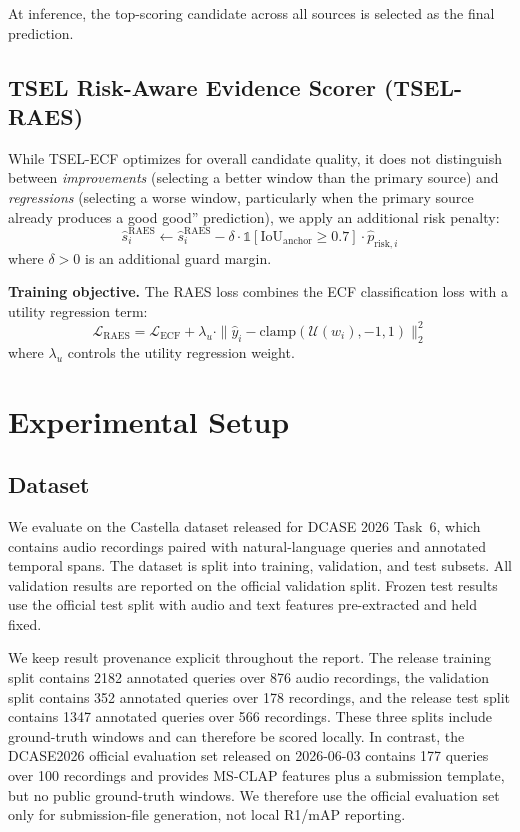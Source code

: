 \documentclass[conference]{IEEEtran}
\begin{document}
At inference, the top-scoring candidate across all sources is selected as the
final prediction.

\subsection{TSEL Risk-Aware Evidence Scorer (TSEL-RAES)}
\label{sec:raes}

While TSEL-ECF optimizes for overall candidate quality, it does not
distinguish between \emph{improvements} (selecting a better window than the
primary source) and \emph{regressions} (selecting a worse window, particularly
when the primary source already produces a good good'' prediction), we apply an additional risk
penalty:
\begin{equation}
\label{eq:anchor_guard}
\hat{s}_i^{\text{RAES}} \leftarrow \hat{s}_i^{\text{RAES}} - \delta \cdot
\mathbb{1}[\text{IoU}_{\text{anchor}} \geq 0.7] \cdot \hat{p}_{\text{risk}, i}
\end{equation}
where \(\delta > 0\) is an additional guard margin.

\textbf{Training objective.}  The RAES loss combines the ECF classification loss
with a utility regression term:
\begin{equation}
\label{eq:raes_loss}
\mathcal{L}_{\text{RAES}} = \mathcal{L}_{\text{ECF}} + \lambda_u \cdot
\| \hat{y}_i - \text{clamp}(\mathcal{U}(w_i), -1, 1) \|_2^2
\end{equation}
where \(\lambda_u\) controls the utility regression weight.

\section{Experimental Setup}
\label{sec:setup}

\subsection{Dataset}
We evaluate on the Castella dataset released for DCASE 2026 Task~6, which
contains audio recordings paired with natural-language queries and annotated
temporal spans.  The dataset is split into training, validation, and test
subsets.  All validation results are reported on the official validation split.
Frozen test results use the official test split with audio and text features
pre-extracted and held fixed.

We keep result provenance explicit throughout the report.  The release training
split contains 2182 annotated queries over 876 audio recordings, the validation
split contains 352 annotated queries over 178 recordings, and the release test
split contains 1347 annotated queries over 566 recordings.  These three splits
include ground-truth windows and can therefore be scored locally.  In contrast,
the DCASE2026 official evaluation set released on 2026-06-03 contains 177
queries over 100 recordings and provides MS-CLAP features plus a submission
template, but no public ground-truth windows.  We therefore use the official
evaluation set only for submission-file generation, not local R1/mAP reporting.
\end{document}

